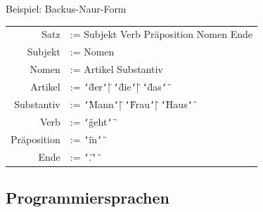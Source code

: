 \documentclass[german]{spicker}
\newenvironment{allintypewriter}{\ttfamily}{\par}
\newcommand*{\ditto}{\texttt{\char`\"}}
\begin{document}
\begin{bonus}{Beispiel: Backus-Naur-Form}
    \begin{allintypewriter}
        \begin{tabular}{rl}
            Satz        & := Subjekt Verb Präposition Nomen Ende                       \\
            Subjekt     & := Nomen                                                     \\
            Nomen       & := Artikel Substantiv                                        \\
            Artikel     & := \ditto der\ditto | \ditto die\ditto | \ditto das\ditto    \\
            Substantiv  & := \ditto Mann\ditto | \ditto Frau\ditto | \ditto Haus\ditto \\
            Verb        & := \ditto geht\ditto                                         \\
            Präposition & := \ditto in\ditto                                           \\
            Ende        & := \ditto .\ditto
        \end{tabular}
    \end{allintypewriter}
\end{bonus}

\subsection{Programmiersprachen}
\end{document}
